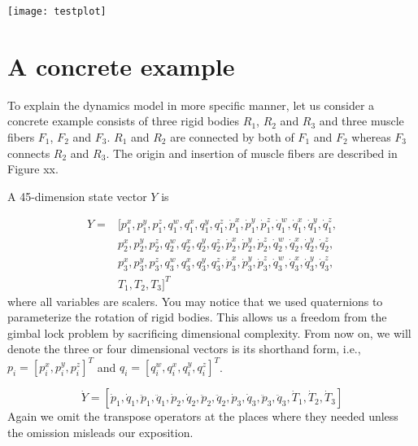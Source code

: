 \documentclass[a4paper,10pt]{article}
\begin{document}
\texttt{[image: testplot]}

\section{A concrete example}

To explain the dynamics model in more specific manner, let us consider
a concrete example consists of three rigid bodies $R_1$, $R_2$ and $R_3$
and three muscle fibers $F_1$, $F_2$ and $F_3$. $R_1$ and $R_2$ are connected
by both of $F_1$ and $F_2$ whereas $F_3$ connects $R_2$ and $R_3$. The
origin and insertion of muscle fibers are described in Figure xx.

A 45-dimension state vector $Y$ is

\begin{align*}
Y = {} & [p_1^x, p_1^y, p_1^z, q_1^w, q_1^x, q_1^y, q_1^z, \dot{p}_1^x, \dot{p}_1^y, \dot{p}_1^z, \dot{q}_1^w, \dot{q}_1^x, \dot{q}_1^y, \dot{q}_1^z,\\
       &  p_2^x, p_2^y, p_2^z, q_2^w, q_2^x, q_2^y, q_2^z, \dot{p}_2^x, \dot{p}_2^y, \dot{p}_2^z, \dot{q}_2^w, \dot{q}_2^x, \dot{q}_2^y, \dot{q}_2^z,\\
       &  p_3^x, p_3^y, p_3^z, q_3^w, q_3^x, q_3^y, q_3^z, \dot{p}_3^x, \dot{p}_3^y, \dot{p}_3^z, \dot{q}_3^w, \dot{q}_3^x, \dot{q}_3^y, \dot{q}_3^z,\\
       & T_1, T_2, T_3]^T
\end{align*}
where all variables are scalers. You may notice that we used quaternions
to parameterize the rotation of rigid bodies. This allows us a freedom
from the gimbal lock problem by sacrificing dimensional complexity. From
now on, we will denote the three or four dimensional vectors is its shorthand
form, i.e., $p_i=[p_i^x, p_i^y, p_i^z]^T$ and $q_i=[q_i^w, q_i^x, q_i^y, q_i^z]^T$.

\begin{equation}
\dot{Y}  =  [\dot{p}_1, \dot{q}_1, \ddot{p}_1, \ddot{q}_1,
               \dot{p}_2, \dot{q}_2, \ddot{p}_2, \ddot{q}_2,
               \dot{p}_3, \dot{q}_3, \ddot{p}_3, \ddot{q}_3,
               \dot{T}_1, \dot{T}_2, \dot{T}_3]
\end{equation}
Again we omit the transpose operators at the places where they needed
unless the omission misleads our exposition.
\end{document}
